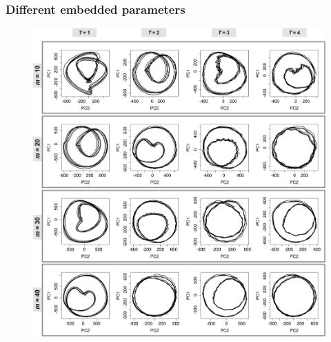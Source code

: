 \documentclass{beamer}
\begin{document}
\begin{frame}
\frametitle{Different embedded parameters}
\vspace{-0.6cm}
\begin{figure}
\includegraphics[scale=0.07]{takens} \\

\end{figure}  
\end{frame}
\end{document}
